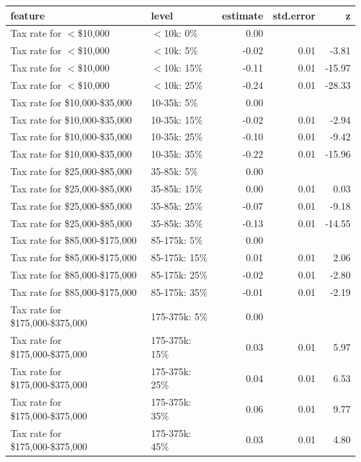 \documentclass[a4paper,12pt]{article}\usepackage[]{graphicx}\usepackage[]{color}
\begin{document}
\begin{table}[ht]
\centering
\begin{tabular}{lp{1.5in}rrr}
  \hline
feature & level & estimate & std.error & z \\ 
  \hline
Tax rate for $<$\$10,000 & $<$10k: 0\% & 0.00 &  &  \\ 
  Tax rate for $<$\$10,000 & $<$10k: 5\% & -0.02 & 0.01 & -3.81 \\ 
  Tax rate for $<$\$10,000 & $<$10k: 15\% & -0.11 & 0.01 & -15.97 \\ 
  Tax rate for $<$\$10,000 & $<$10k: 25\% & -0.24 & 0.01 & -28.33 \\ 
  Tax rate for \$10,000-\$35,000 & 10-35k: 5\% & 0.00 &  &  \\ 
  Tax rate for \$10,000-\$35,000 & 10-35k: 15\% & -0.02 & 0.01 & -2.94 \\ 
  Tax rate for \$10,000-\$35,000 & 10-35k: 25\% & -0.10 & 0.01 & -9.42 \\ 
  Tax rate for \$10,000-\$35,000 & 10-35k: 35\% & -0.22 & 0.01 & -15.96 \\ 
  Tax rate for \$25,000-\$85,000 & 35-85k: 5\% & 0.00 &  &  \\ 
  Tax rate for \$25,000-\$85,000 & 35-85k: 15\% & 0.00 & 0.01 & 0.03 \\ 
  Tax rate for \$25,000-\$85,000 & 35-85k: 25\% & -0.07 & 0.01 & -9.18 \\ 
  Tax rate for \$25,000-\$85,000 & 35-85k: 35\% & -0.13 & 0.01 & -14.55 \\ 
  Tax rate for \$85,000-\$175,000 & 85-175k: 5\% & 0.00 &  &  \\ 
  Tax rate for \$85,000-\$175,000 & 85-175k: 15\% & 0.01 & 0.01 & 2.06 \\ 
  Tax rate for \$85,000-\$175,000 & 85-175k: 25\% & -0.02 & 0.01 & -2.80 \\ 
  Tax rate for \$85,000-\$175,000 & 85-175k: 35\% & -0.01 & 0.01 & -2.19 \\ 
  Tax rate for \$175,000-\$375,000 & 175-375k: 5\% & 0.00 &  &  \\ 
  Tax rate for \$175,000-\$375,000 & 175-375k: 15\% & 0.03 & 0.01 & 5.97 \\ 
  Tax rate for \$175,000-\$375,000 & 175-375k: 25\% & 0.04 & 0.01 & 6.53 \\ 
  Tax rate for \$175,000-\$375,000 & 175-375k: 35\% & 0.06 & 0.01 & 9.77 \\ 
  Tax rate for \$175,000-\$375,000 & 175-375k: 45\% & 0.03 & 0.01 & 4.80 \\ 

\end{tabular}
\end{table}
\end{document}

